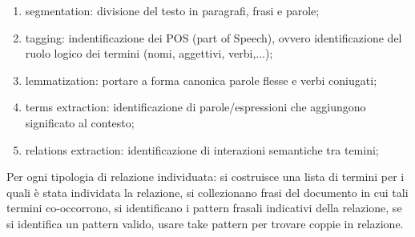 \begin{enumerate}
	
	\item segmentation: divisione del testo in paragrafi, frasi e parole;
	
	\item tagging: indentificazione dei POS (part of Speech), ovvero identificazione del ruolo logico dei termini (nomi, aggettivi, verbi,...);
	
	\item lemmatization: portare a forma canonica parole flesse e verbi coniugati;
	
	\item terms extraction: identificazione di parole/espressioni che aggiungono significato al contesto;
	
	\item relations extraction: identificazione di interazioni semantiche tra temini;
	
\end{enumerate}

Per ogni tipologia di relazione individuata:
si costruisce una lista di termini per i quali è stata individata la relazione, 
si collezionano frasi del documento in cui tali termini co-occorrono,
si identificano i pattern frasali indicativi della relazione,
se si identifica un pattern valido, usare take pattern per trovare coppie in relazione.